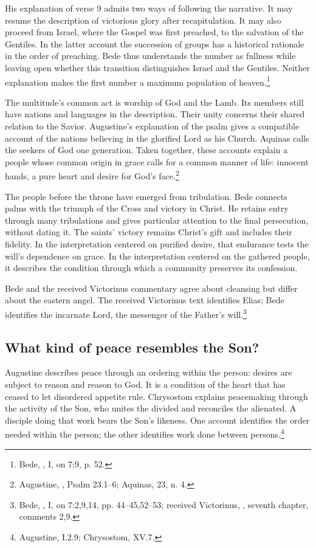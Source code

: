 His explanation of verse 9 admits two ways of following the narrative. It may resume the description of victorious glory after recapitulation. It may also proceed from Israel, where the Gospel was first preached, to the salvation of the Gentiles. In the latter account the succession of groups has a historical rationale in the order of preaching. Bede thus understands the number as fullness while leaving open whether this transition distinguishes Israel and the Gentiles. Neither explanation makes the first number a maximum population of heaven.\footnote{Bede, , I, on 7:9, p. 52.}

The multitude's common act is worship of God and the Lamb. Its members still have nations and languages in the description. Their unity concerns their shared relation to the Savior. Augustine's explanation of the psalm gives a compatible account of the nations believing in the glorified Lord as his Church. Aquinas calls the seekers of God one generation. Taken together, these accounts explain a people whose common origin in grace calls for a common manner of life: innocent hands, a pure heart and desire for God's face.\footnote{Augustine, , Psalm 23.1--6; Aquinas,  23, n. 4.}

The people before the throne have emerged from tribulation. Bede connects palms with the triumph of the Cross and victory in Christ. He retains entry through many tribulations and gives particular attention to the final persecution, without dating it. The saints' victory remains Christ's gift and includes their fidelity. In the interpretation centered on purified desire, that endurance tests the will's dependence on grace. In the interpretation centered on the gathered people, it describes the condition through which a community preserves its confession.

Bede and the received Victorinus commentary agree about cleansing but differ about the eastern angel. The received Victorinus text identifies Elias; Bede identifies the incarnate Lord, the messenger of the Father's will.\footnote{Bede, , I, on 7:2,9,14, pp. 44--45,52--53; received Victorinus, , seventh chapter, comments 2,9.}

\subsection{What kind of peace resembles the Son?}
Augustine describes peace through an ordering within the person: desires are subject to reason and reason to God. It is a condition of the heart that has ceased to let disordered appetite rule. Chrysostom explains peacemaking through the activity of the Son, who unites the divided and reconciles the alienated. A disciple doing that work bears the Son's likeness. One account identifies the order needed within the person; the other identifies work done between persons.\footnote{Augustine,  I.2.9; Chrysostom,  XV.7.}

